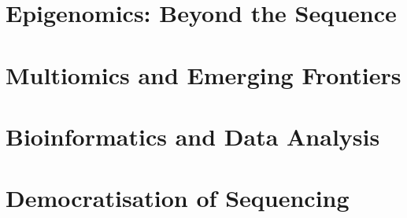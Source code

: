 \documentclass[11pt,a4paper,twoside,openright]{book}
\begin{document}
\part{Epigenomics: Beyond the Sequence}





\part{Multiomics and Emerging Frontiers}




\part{Bioinformatics and Data Analysis}





\part{Democratisation of Sequencing}




\backmatter

\printglossary[type=\acronymtype,title={List of Acronyms}]
\printglossary[title={Glossary}]

\printbibliography[heading=bibintoc,title={References}]
\end{document}

